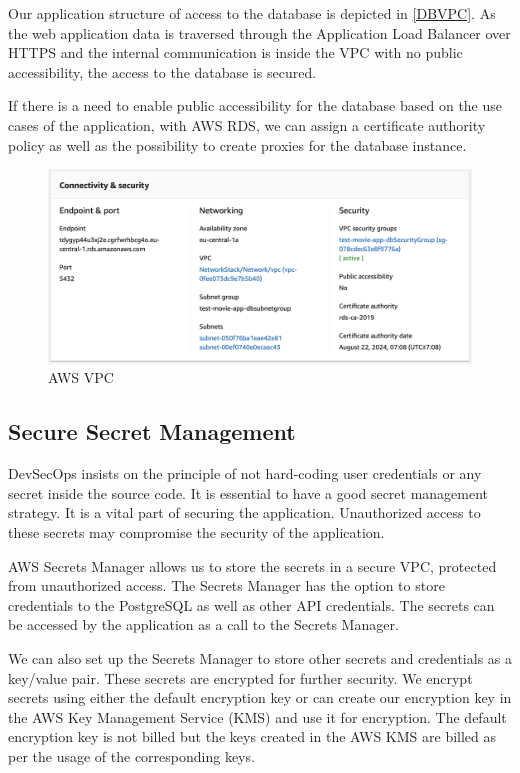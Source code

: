 Our application structure of access to the database is depicted in \autoref{DBVPC}. As the web application data is traversed through the Application Load Balancer over HTTPS and the internal communication is inside the VPC with no public accessibility, the access to the database is secured.

If there is a need to enable public accessibility for the database based on the use cases of the application, with AWS RDS, we can assign a certificate authority policy as well as the possibility to create proxies for the database instance.


\begin{figure}[h]
\centerline{\includegraphics[scale=.36]{images/Sinchan/7sinchan.png}}
\caption{AWS VPC}
\label{fig7sinchan}
\end{figure}

\subsection{Secure Secret Management}

DevSecOps insists on the principle of not hard-coding user credentials or any secret inside the source code. It is essential to have a good secret management strategy. It is a vital part of securing the application. Unauthorized access to these secrets may compromise the security of the application.

AWS Secrets Manager allows us to store the secrets in a secure VPC, protected from unauthorized access. The Secrets Manager has the option to store credentials to the PostgreSQL as well as other API credentials. The secrets can be accessed by the application as a call to the Secrets Manager.

We can also set up the Secrets Manager to store other secrets and credentials as a key/value pair. These secrets are encrypted for further security. We encrypt secrets using either the default encryption key or can create our encryption key in the AWS Key Management Service (KMS) and use it for encryption. The default encryption key is not billed but the keys created in the AWS KMS are billed as per the usage of the corresponding keys.
